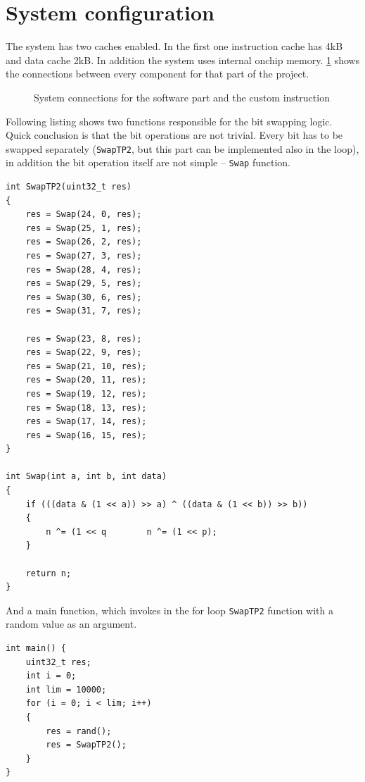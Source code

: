 \section{System configuration}
The system has two caches enabled. In the first one instruction cache has 4kB and data cache 2kB. In addition the system uses internal onchip memory. \figurename{} \ref{fig:system1} shows the connections between every component for that part of the project. 
\begin{figure}[H]
	\begin{center}
	\end{center}
	\caption{System connections for the software part and the custom instruction}

	\label{fig:system1}
\end{figure}

Following listing shows two functions responsible for the bit swapping logic. Quick conclusion is that the bit operations are not trivial. Every bit has to be swapped separately (\verb|SwapTP2|, but this part can be implemented also in the loop), in addition the bit operation itself are not simple -- \verb|Swap| function. 
\begin{lstlisting}[style=customc, frame=none]
int SwapTP2(uint32_t res)
{
    res = Swap(24, 0, res);
    res = Swap(25, 1, res);
    res = Swap(26, 2, res);
    res = Swap(27, 3, res);
    res = Swap(28, 4, res);
    res = Swap(29, 5, res);
    res = Swap(30, 6, res);
    res = Swap(31, 7, res);
    
    res = Swap(23, 8, res);
    res = Swap(22, 9, res);
    res = Swap(21, 10, res);
    res = Swap(20, 11, res);
    res = Swap(19, 12, res);
    res = Swap(18, 13, res);
    res = Swap(17, 14, res);
    res = Swap(16, 15, res);
}

int Swap(int a, int b, int data)
{
    if (((data & (1 << a)) >> a) ^ ((data & (1 << b)) >> b))
    {
        n ^= (1 << q        n ^= (1 << p);
    }

    return n;
}
\end{lstlisting}
And a main function, which invokes in the for loop \verb|SwapTP2| function with a random value as an argument.
\begin{lstlisting}[style=customc, frame=none]
int main() {
    uint32_t res;
    int i = 0;
    int lim = 10000;
    for (i = 0; i < lim; i++)
    {
        res = rand();
        res = SwapTP2();
    }
}
\end{lstlisting}

